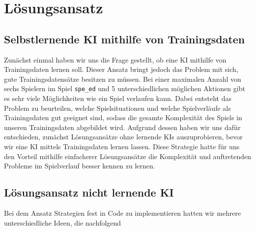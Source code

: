 \chapter{Lösungsansatz}
\label{ch:loesungsansatz}


\section{Selbstlernende KI mithilfe von Trainingsdaten}
\label{sec:selbstlernende-ki-trainingsdaten}

Zunächst einmal haben wir uns die Frage gestellt, ob eine \acs{KI} mithilfe von Trainingsdaten lernen soll.
Dieser Ansatz bringt jedoch das Problem mit sich, gute Trainingsdatensätze besitzen zu müssen. 
Bei einer maximalen Anzahl von sechs Spielern im Spiel \texttt{spe\_ed} und 5 unterschiedlichen möglichen Aktionen gibt
es sehr viele Möglichkeiten wie ein Spiel verlaufen kann. 
Dabei entsteht das Problem zu beurteilen, welche Spielsituationen und welche Spielverläufe als Trainingsdaten gut geeignet sind, 
sodass die gesamte Komplexität des Spiels in unseren Trainingsdaten abgebildet wird.
Aufgrund dessen haben wir uns dafür entschieden, zunächst Lösungsansätze ohne lernende \acs{KI}s auszuprobieren, bevor wir eine \acs{KI} mittels Trainingsdaten lernen lassen. 
Diese Strategie hatte für uns den Vorteil mithilfe einfacherer Lösungsansätze die Komplexität und auftretenden Probleme im Spielverlauf besser kennen zu lernen.


\section{Lösungsansatz nicht lernende KI}
\label{sec:loesungsansatz-nicht-lernende-KI}

Bei dem Ansatz Strategien fest in Code zu implementieren hatten wir mehrere unterschiedliche Ideen, die nachfolgend
